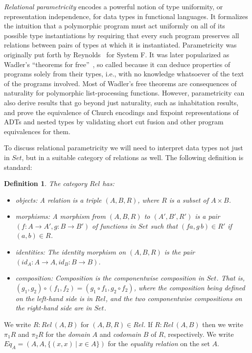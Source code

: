 \documentclass[submission,copyright,creativecommons]{eptcs}
\newtheorem{definition}[thm]{Definition}
\begin{document}
{\em Relational parametricity} encodes a powerful notion of type
uniformity, or representation independence, for data types in
functional languages. It formalizes the intuition that a polymorphic
program must act uniformly on all of its possible type instantiations
by requiring that every such program preserves all relations between
pairs of types at which it is instantiated. Parametricity was
originally put forth by Reynolds~\cite{rey83} for System F. It was
later popularized as Wadler's ``theorems for free''~\cite{wad89}, so
called because it can deduce properties of programs solely from their
types, i.e., with no knowledge whatsoever of the text of the programs
involved.  Most of Wadler's free theorems are consequences of
naturality for polymorphic list-processing functions. However,
parametricity can also derive results that go beyond just naturality,
such as inhabitation results, and prove the equivalence of Church
encodings and fixpoint representations of ADTs and
nested types by validating short cut fusion and other program
equivalences for them.

To discuss relational parametricity we will need to interpret data
types not just in $\mathit{Set}$, but in a suitable category of
relations as well. The following definition is standard:
\begin{definition}
  The category $\mathit{Rel}$ has:
  \begin{itemize}
\item objects: A relation is a triple $(A,B,R)$, where $R$ is a
  subset of $A \times B$.
\item morphisms: A morphism from $(A,B,R)$ to $(A',B',R')$ is a pair
  $(f : A \to A',g : B \to B')$ of functions in $\mathit{Set}$ such
  that $(f a,g\,b) \in R'$ if $(a,b) \in R$.
\item identities: The identity morphism on $(A,B,R)$ is the pair
  $(\mathit{id}_A : A \to A, \mathit{id}_B : B \to B)$.
\item composition: Composition is the componentwise composition in
  $\mathit{Set}$. That is, $(g_1,g_2) \circ (f_1,f_2) = (g_1 \circ
  f_1, g_2 \circ f_2)$, where the composition being defined on the
  left-hand side is in $\mathit{Rel}$, and the two componentwise
  compositions on the right-hand side are in $\mathit{Set}$.
\end{itemize}
\end{definition}
\noindent
We write $R : \mathit{Rel}\,(A,B)$ for $(A,B,R) \in \mathit{Rel}$.  If
$R : \mathit{Rel}\,(A,B)$ then we write $\pi_1 R$ and $\pi_2 R$ for
the {\em domain} $A$ and {\em codomain} $B$ of $R$, respectively. We
write $\mathit{Eq}_A = (A,A,\{(x,x)~|~ x \in A\})$ for the {\em
  equality relation} on the set $A$.
\end{document}
